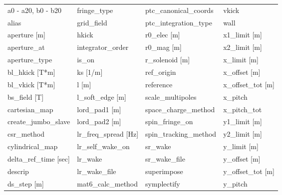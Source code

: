  \begin{tabular}{llll} \toprule
a0 - a20, b0 - b20             & fringe_type                    & ptc_canonical_coords           & vkick                          \\
alias                          & grid_field                     & ptc_integration_type           & wall                           \\
aperture [m]                   & hkick                          & r0_elec [m]                    & x1_limit [m]                   \\
aperture_at                    & integrator_order               & r0_mag [m]                     & x2_limit [m]                   \\
aperture_type                  & is_on                          & r_solenoid [m]                 & x_limit [m]                    \\
bl_hkick [T*m]                 & ks [1/m]                       & ref_origin                     & x_offset [m]                   \\
bl_vkick [T*m]                 & l [m]                          & reference                      & x_offset_tot [m]               \\
bs_field [T]                   & l_soft_edge [m]                & scale_multipoles               & x_pitch                        \\
cartesian_map                  & lord_pad1 [m]                  & space_charge_method            & x_pitch_tot                    \\
create_jumbo_slave             & lord_pad2 [m]                  & spin_fringe_on                 & y1_limit [m]                   \\
csr_method                     & lr_freq_spread [Hz]            & spin_tracking_method           & y2_limit [m]                   \\
cylindrical_map                & lr_self_wake_on                & sr_wake                        & y_limit [m]                    \\
delta_ref_time [sec]           & lr_wake                        & sr_wake_file                   & y_offset [m]                   \\
descrip                        & lr_wake_file                   & superimpose                    & y_offset_tot [m]               \\
ds_step [m]                    & mat6_calc_method               & symplectify                    & y_pitch                        \\

\end{tabular}

